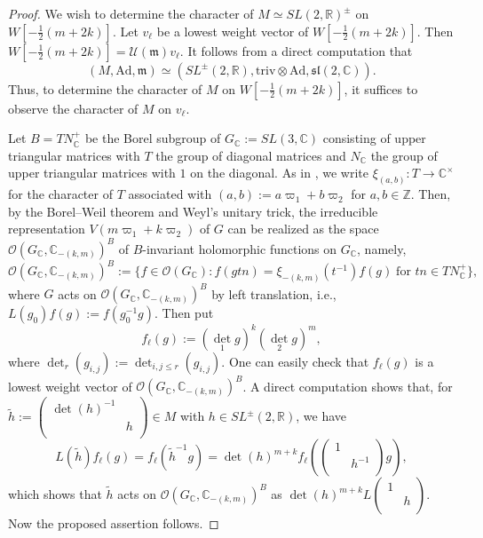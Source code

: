 \documentclass[reqno,11pt]{amsart}
\theoremstyle{remark}
\numberwithin{equation}{section}
\newcommand{\fm}{{\mathfrak m}}
\newcommand{\f}{\mathfrak}
\newcommand{\R}{\mathbb{R}}
\newcommand{\C}{\mathbb{C}}
\newcommand{\Z}{\mathbb{Z}}
\newcommand{\Ad}{\mathrm{Ad}}
\newcommand{\Cal}{\mathcal}
\newcommand{\triv}{\mathrm{triv}}
\begin{document}
\begin{proof}
We wish to determine the character of $M\simeq SL(2,\R)^{\pm}$ on 
$W[-\tfrac{1}{2}(m+2k)]$. Let $v_\ell$ be a lowest weight vector
of $W[-\tfrac{1}{2}(m+2k)]$. Then $W[-\tfrac{1}{2}(m+2k)] = \Cal{U}(\fm)v_\ell$.
It follows from a direct computation that
\begin{equation*}
(M, \Ad, \fm) \simeq (SL^{\pm}(2,\R), \triv\otimes \Ad,\f{sl}(2,\C)).
\end{equation*}
Thus, to determine the character of $M$ on $W[-\tfrac{1}{2}(m+2k)]$, it suffices to 
observe the character of $M$ on $v_\ell$.

Let $B=TN^+_\C$ be the Borel subgroup of $G_\C:=SL(3,\C)$ consisting of 
upper triangular matrices with $T$ the group of diagonal matrices
and $N_\C$ the group of upper triangular matrices with $1$ on the diagonal.
As in \cite[Exer.\ 7.34]{Sepanski07},
we write $\xi_{(a,b)}\colon T \to \C^\times$ for the character of $T$
associated with $(a,b):=a\varpi_1+b\varpi_2$ for $a, b \in \Z$.
Then, by the Borel--Weil theorem and Weyl's unitary trick, the 
irreducible representation $V(m\varpi_1+k\varpi_2)$ of $G$ can be realized as
the space $\Cal{O}(G_\C, \C_{-(k,m)})^B$ of $B$-invariant 
holomorphic functions on $G_\C$, namely,
\begin{equation*}
\Cal{O}(G_\C, \C_{-(k,m)})^B
:=
\{f \in \Cal{O}(G_\C) : 
f(gtn)=\xi_{-(k,m)}(t^{-1})f(g)\; \text{for $tn \in TN^+_\C$}\},
\end{equation*}
where $G$ acts on $\Cal{O}(G_\C, \C_{-(k,m)})^B$ by left translation, i.e.,
$L(g_0)f(g):=f(g_0^{-1}g)$.
Then put
\begin{equation*}
f_\ell(g):=({\det}_1g)^{k}({\det}_2g)^{m},
\end{equation*}
where ${\det}_r(g_{i,j}):={\det}_{i,j\leq r}(g_{i,j})$.
One can easily check that $f_\ell(g)$ is a lowest weight vector of
$\Cal{O}(G_\C, \C_{-(k,m)})^B$.
A direct computation shows that, for $\widetilde{h}:=
\begin{pmatrix}
\det(h)^{-1} &\\
& h\\
\end{pmatrix}
\in M$ with $h \in SL^{\pm}(2,\R)$, we have
\begin{equation*}
L(\widetilde{h})f_\ell(g)=
f_\ell(\widetilde{h}^{-1}g)=\det(h)^{m+k}f_\ell(\begin{pmatrix}
1 &\\
& h^{-1}\\
\end{pmatrix}
g),
\end{equation*}
which shows that $\widetilde{h}$ acts on $\Cal{O}(G_\C, \C_{-(k,m)})^B$
as $\det(h)^{m+k} L\begin{pmatrix}
1 &\\
& h\\
\end{pmatrix}$.
Now the proposed assertion follows.
\end{proof}
\end{document}
